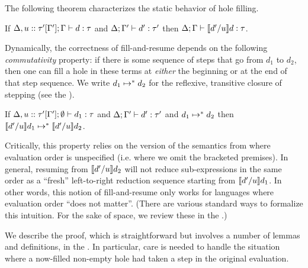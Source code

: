 

The following theorem characterizes the static behavior of hole filling.
\begin{thm}[Filling]
  If $\Delta, u :: \tau'[\Gamma']; \Gamma \vdash d : \tau$
  and $\Delta; \Gamma' \vdash d' : \tau'$
  then $\Delta; \Gamma \vdash \llbracket d' / u\rrbracket d : \tau$.
\end{thm}

Dynamically, the correctness of fill-and-resume depends on
the following \emph{commutativity} property: if there is some sequence of
steps that go from $d_1$ to $d_2$, then one can fill a hole in these
terms at \emph{either} the beginning or at the end of that step
sequence.
%
We write $d_1 \mapsto^* d_2$ for the reflexive,
transitive closure of stepping (see the \appendixName).
%
\begin{thm}[Commutativity]
  If $\Delta, u :: \tau'[\Gamma']; \emptyset \vdash d_1 : \tau$
  and $\Delta; \Gamma' \vdash d' : \tau'$ and $d_1 \mapsto^* d_2$
  then $\llbracket d' / u\rrbracket d_1 \mapsto^* \llbracket d' / u\rrbracket d_2$.
\end{thm}
%
Critically, this property relies on the version of
the semantics from  where evaluation order is
unspecified (i.e. where we omit the bracketed premises).
%
In general, resuming from $\llbracket d' / u\rrbracket d_2$ will not
reduce sub-expressions in the same order as a ``fresh'' left-to-right
reduction sequence starting from $\llbracket d' / u\rrbracket d_1$.
%
In other words, this notion of fill-and-resume only works for
languages where evaluation order ``does not matter''.
(There are various standard ways to formalize this intuition.
For the sake of space, we review these in the \appendixName.)


We describe the proof, which is straightforward but involves a
number of lemmas and definitions, in the \appendixName.
%
In particular, care is needed to handle the situation where a
now-filled non-empty hole had taken a step in the original evaluation.


